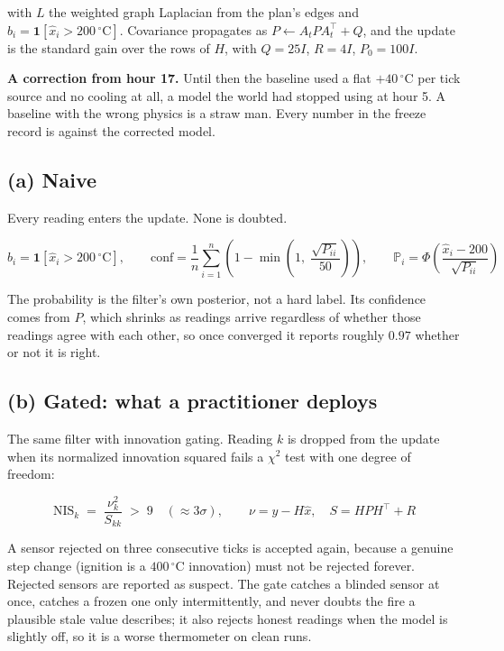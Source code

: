 \documentclass[11pt]{article}
\newcommand{\onetrue}[1]{\mathbf{1}\!\left[#1\right]}
\newcommand{\degC}{^\circ\mathrm{C}}
\begin{document}
with $L$ the weighted graph Laplacian from the plan's edges and $b_i = \onetrue{\hat{x}_i > 200\,\degC}$. Covariance propagates as $P \leftarrow A_t P A_t^{\!\top} + Q$, and the update is the standard gain over the rows of $H$, with $Q = 25I$, $R = 4I$, $P_0 = 100I$.

\begin{keybox}
\textbf{A correction from hour 17.} Until then the baseline used a flat $+40\,\degC$ per tick source and no cooling at all, a model the world had stopped using at hour 5. A baseline with the wrong physics is a straw man. Every number in the freeze record is against the corrected model.
\end{keybox}

\subsection*{(a) Naive}

Every reading enters the update. None is doubted.

\begin{equation}
  b_i = \onetrue{\hat{x}_i > 200\,\degC},
  \qquad
  \mathrm{conf} = \frac{1}{n}\sum_{i=1}^{n}\left(1 - \min\!\left(1,\; \frac{\sqrt{P_{ii}}}{50}\right)\right),
  \qquad
  \mathbb{P}_i = \Phi\!\left(\frac{\hat{x}_i - 200}{\sqrt{P_{ii}}}\right)
\end{equation}

The probability is the filter's own posterior, not a hard label. Its confidence comes from $P$, which shrinks as readings arrive regardless of whether those readings agree with each other, so once converged it reports roughly $0.97$ whether or not it is right.

\subsection*{(b) Gated: what a practitioner deploys}

The same filter with innovation gating. Reading $k$ is dropped from the update when its normalized innovation squared fails a $\chi^2$ test with one degree of freedom:

\begin{equation}
  \mathrm{NIS}_k \;=\; \frac{\nu_k^{2}}{S_{kk}} \;>\; 9 \quad (\approx 3\sigma),
  \qquad \nu = y - H\hat{x}, \quad S = HPH^{\!\top} + R
\end{equation}

A sensor rejected on three consecutive ticks is accepted again, because a genuine step change (ignition is a $400\,\degC$ innovation) must not be rejected forever. Rejected sensors are reported as suspect. The gate catches a blinded sensor at once, catches a frozen one only intermittently, and never doubts the fire a plausible stale value describes; it also rejects honest readings when the model is slightly off, so it is a worse thermometer on clean runs.
\end{document}
